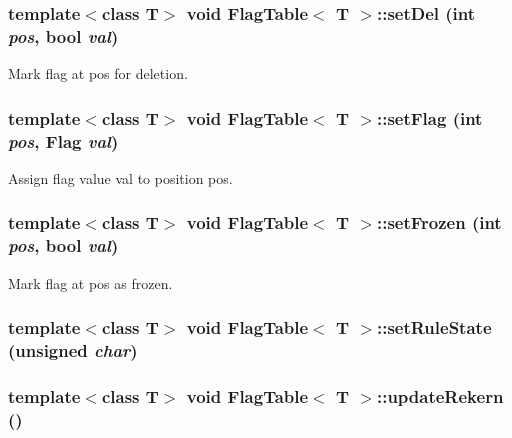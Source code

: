 \subsubsection{\setlength{\rightskip}{0pt plus 5cm}template$<$class T$>$ void {\bf Flag\-Table}$<$ T $>$::set\-Del (int {\em pos}, bool {\em val})\hspace{0.3cm}{\tt  [inline]}}\label{classFlagTable_a13}


Mark flag at pos for deletion. 

\subsubsection{\setlength{\rightskip}{0pt plus 5cm}template$<$class T$>$ void {\bf Flag\-Table}$<$ T $>$::set\-Flag (int {\em pos}, {\bf Flag} {\em val})\hspace{0.3cm}{\tt  [inline]}}\label{classFlagTable_a11}


Assign flag value val to position pos. 

\subsubsection{\setlength{\rightskip}{0pt plus 5cm}template$<$class T$>$ void {\bf Flag\-Table}$<$ T $>$::set\-Frozen (int {\em pos}, bool {\em val})\hspace{0.3cm}{\tt  [inline]}}\label{classFlagTable_a12}


Mark flag at pos as frozen. 

\subsubsection{\setlength{\rightskip}{0pt plus 5cm}template$<$class T$>$ void {\bf Flag\-Table}$<$ T $>$::set\-Rule\-State (unsigned {\em char})}\label{classFlagTable_a19}


\subsubsection{\setlength{\rightskip}{0pt plus 5cm}template$<$class T$>$ void {\bf Flag\-Table}$<$ T $>$::update\-Rekern ()}\label{classFlagTable_a20}




